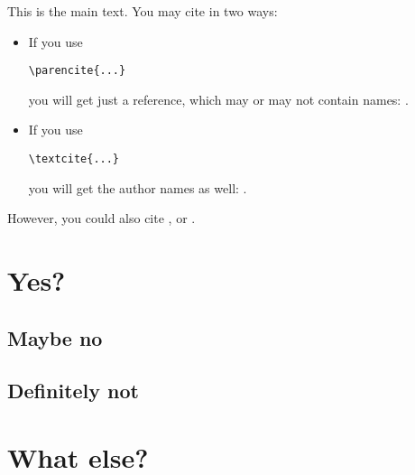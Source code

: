 This is the main text. You may cite in two ways:
\begin{itemize}
  \item If you use \begin{verbatim}\parencite{...}\end{verbatim} you will get just a reference, which may
    or may not contain names: \parencite{Qian2021}.
  \item If you use \begin{verbatim}\textcite{...}\end{verbatim} you will get the author names as well: \textcite{Qian2021}.
\end{itemize}

However, you could also cite \textcite{Sayama2020}, or \textcite{Bullock2023}.

\lipsum[1-2]

\section{Yes?}

\subsection{Maybe no}

  \lipsum[3]

\subsection{Definitely not}
  \lipsum[4]
  
\section{What else?}
  \lipsum[5-13]
